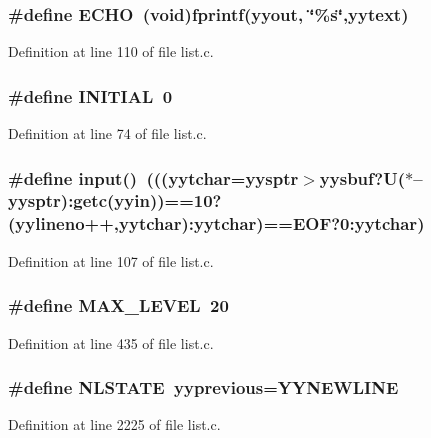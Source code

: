 \subsubsection{\setlength{\rightskip}{0pt plus 5cm}\#define ECHO~(void)fprintf(\bf{yyout}, \char`\"{}\%s\char`\"{},yytext)}\label{list_8c_ad1dc60a04a1d8cfc8b3ded13601e361}




Definition at line 110 of file list.c.
\subsubsection{\setlength{\rightskip}{0pt plus 5cm}\#define INITIAL~0}\label{list_8c_a3d063564f6ab16f6d408b8369d0e9ff}




Definition at line 74 of file list.c.
\subsubsection{\setlength{\rightskip}{0pt plus 5cm}\#define input()~(((\bf{yytchar}=\bf{yysptr}$>$\bf{yysbuf}?U($\ast$--\bf{yysptr}):getc(\bf{yyin}))==10?(\bf{yylineno}++,\bf{yytchar}):\bf{yytchar})==EOF?0:\bf{yytchar})}\label{list_8c_1dd66d9c1e77fe5c37ddce38fd30acb7}




Definition at line 107 of file list.c.
\subsubsection{\setlength{\rightskip}{0pt plus 5cm}\#define MAX\_\-LEVEL~20}\label{list_8c_5bb4257ca9fa4bfcf9391b7895b97761}




Definition at line 435 of file list.c.
\subsubsection{\setlength{\rightskip}{0pt plus 5cm}\#define NLSTATE~\bf{yyprevious}=YYNEWLINE}\label{list_8c_0a3c2dd7ec2541ed7035842c0e5cb7b1}




Definition at line 2225 of file list.c.
